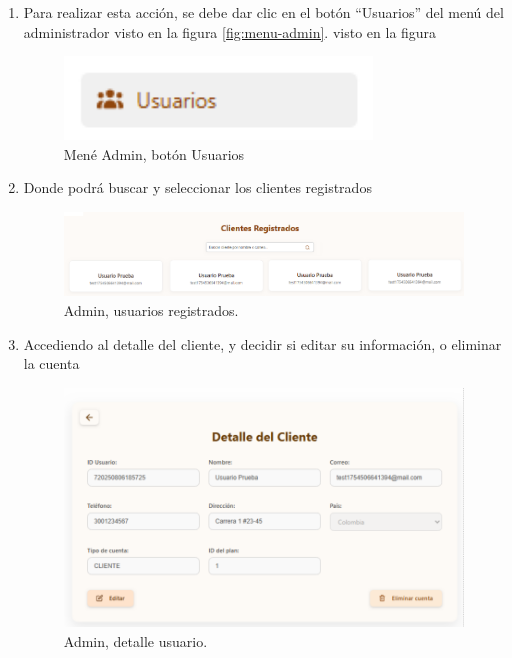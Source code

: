 \begin{enumerate}
    \item Para realizar esta acción, se debe dar clic en el botón “Usuarios” del menú del administrador visto en la figura \ref{fig:menu-admin}.
visto en la figura
        \begin{figure}[H]
            \centering
            \includegraphics[width=0.3\linewidth]{guiamodulo/menu-admin-usuarios.png}
            \caption{Mené Admin, botón Usuarios}
            \label{fig:menu-admin-usuarios}
        \end{figure}

    \item Donde podrá buscar y seleccionar los clientes registrados
    \begin{figure}[H]
        \centering
        \includegraphics[width=0.8\linewidth]{guiamodulo/admin-usuarios-registrados.png}
        \caption{Admin, usuarios registrados.}
        \label{fig:admin-usuarios-registrados}
    \end{figure}

    \item Accediendo al detalle del cliente, y decidir si editar su información, o eliminar la cuenta
    \begin{figure}[H]
        \centering
        \includegraphics[width=0.75\linewidth]{guiamodulo/admin-usuario-detalle.png}
        \caption{Admin, detalle usuario.}
        \label{fig:admin-usuario-detalle}
    \end{figure}
\end{enumerate}

